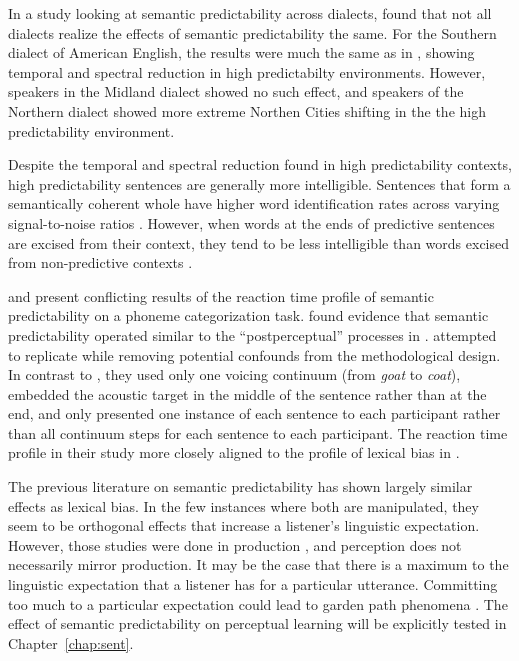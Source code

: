 In a study looking at semantic predictability across dialects, \citet{Clopper2008} found that not all dialects realize the effects of semantic predictability the same.  
For the Southern dialect of American English, the results were much the same as in \citet{Scarborough2010}, showing temporal and spectral reduction in high predictabilty environments.  
However, speakers in the Midland dialect showed no such effect, and speakers of the Northern dialect showed more extreme Northen Cities shifting in the the high predictability environment.

Despite the temporal and spectral reduction found in high predictability contexts, high predictability sentences are generally more intelligible.  
Sentences that form a semantically coherent whole have higher word identification rates across varying signal-to-noise ratios \citep{Kalikow1977}.  
However, when words at the ends of predictive sentences are excised from their context, they tend to be less intelligible than words excised from non-predictive contexts \citep{Lieberman1963}.

\citet{Connine1987} and \citet{Borsky1998} present conflicting results of the reaction time profile of semantic predictability on a phoneme categorization task.
\citet{Connine1987} found evidence that semantic predictability operated similar to the ``postperceptual'' processes in \citet{Connine1987a}.  \citet{Borsky1998} attempted to replicate \citet{Connine1987} while removing potential confounds from the methodological design.  In contrast to \citet{Connine1987}, they used only one voicing continuum (from \emph{goat} to \emph{coat}), embedded the acoustic target in the middle of the sentence rather than at the end, and only presented one instance of each sentence to each participant rather than all continuum steps for each sentence to each participant.  The reaction time profile in their study more closely aligned to the profile of lexical bias in \citet{Connine1987a}.

The previous literature on semantic predictability has shown largely similar effects as lexical bias.  In the few instances where both are manipulated, they seem to be orthogonal effects that increase a listener's linguistic expectation.  However, those studies were done in production \citep{Scarborough2010, Clopper2008}, and perception does not necessarily mirror production.  It may be the case that there is a maximum to the linguistic expectation that a listener has for a particular utterance.  Committing too much to a particular expectation could lead to garden path phenomena \citep{Levy2008}.  The effect of semantic predictability on perceptual learning will be explicitly tested in Chapter~\ref{chap:sent}.


